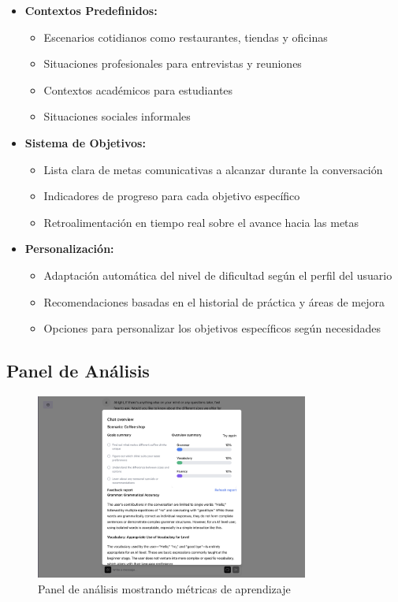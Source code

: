 \begin{itemize}
    \item \textbf{Contextos Predefinidos:}
    \begin{itemize}
        \item Escenarios cotidianos como restaurantes, tiendas y oficinas
        \item Situaciones profesionales para entrevistas y reuniones
        \item Contextos académicos para estudiantes
        \item Situaciones sociales informales
    \end{itemize}
    
    \item \textbf{Sistema de Objetivos:}
    \begin{itemize}
        \item Lista clara de metas comunicativas a alcanzar durante la conversación
        \item Indicadores de progreso para cada objetivo específico
        \item Retroalimentación en tiempo real sobre el avance hacia las metas
    \end{itemize}
    
    \item \textbf{Personalización:}
    \begin{itemize}
        \item Adaptación automática del nivel de dificultad según el perfil del usuario
        \item Recomendaciones basadas en el historial de práctica y áreas de mejora
        \item Opciones para personalizar los objetivos específicos según necesidades
    \end{itemize}
\end{itemize}

\subsection{Panel de Análisis}
\label{panel-analisis}

\begin{figure}[H]
    \centering
    \includegraphics[width=0.8\textwidth]{figuras/screenshots/report.png}
    \caption{Panel de análisis mostrando métricas de aprendizaje}
    \label{fig:analytics-panel}
\end{figure}

